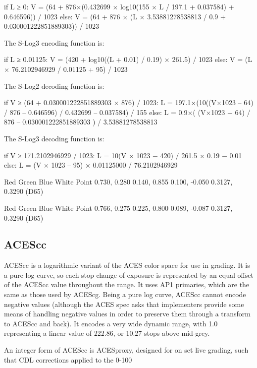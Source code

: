 	if L ≥ 0:
		V = (64 + 876×(0.432699 × log10(155 × L / 197.1 + 0.037584) + 0.646596)) / 1023
	else:
		V = (64 + 876 × (L × 3.53881278538813 / 0.9 + 0.030001222851889303)) / 1023

The S-Log3 encoding function is:

	if L ≥ 0.01125:
		V = (420 + log10((L + 0.01) / 0.19) × 261.5) / 1023
	else:
		V = (L × 76.2102946929 / 0.01125 + 95) / 1023


The S-Log2 decoding function is:

	if V ≥ (64 + 0.030001222851889303 × 876) / 1023:
		L = 197.1×(10((V×1023 – 64) / 876 – 0.646596) / 0.432699  – 0.037584) / 155
	else:
		L = 0.9×( (V×1023 − 64) / 876 – 0.030001222851889303 ) / 3.53881278538813

The S-Log3 decoding function is:

	if V ≥ 171.2102946929 / 1023:
		L = 10(V × 1023 − 420) / 261.5 × 0.19 − 0.01
	else:
		L = (V × 1023 – 95) × 0.01125000 / 76.2102946929



Red
Green
Blue
White Point
0.730, 0.280
0.140, 0.855
0.100, -0.050
0.3127, 0.3290 (D65)


Red
Green
Blue
White Point
0.766, 0.275
0.225, 0.800
0.089, -0.087
0.3127, 0.3290 (D65)

\subsection{ACEScc}%
\label{subsec:acescc}

ACEScc is a logarithmic variant of the ACES color space for use in grading. It is a pure log curve, so each stop change of exposure is represented by an equal offset of the ACEScc value throughout the range. It uses AP1 primaries, which are the same as those used by ACEScg. Being a pure log curve, ACEScc cannot encode negative values (although the ACES spec asks that implementers provide some means of handling negative values in order to preserve them through a transform to ACEScc and back). It encodes a very wide dynamic range, with 1.0 representing a linear value of 222.86, or 10.27 stops above mid-grey.

An integer form of ACEScc is ACESproxy, designed for on set live grading, such that CDL corrections applied to the 0-100%

